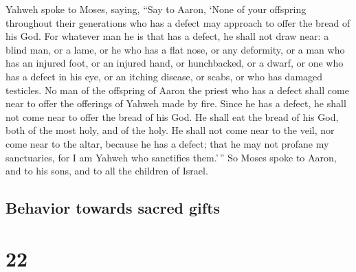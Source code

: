  Yahweh spoke to Moses, saying,  ``Say to
Aaron, `None of your offspring throughout their generations who has a
defect may approach to offer the bread of his God.  For
whatever man he is that has a defect, he shall not draw near: a blind
man, or a lame, or he who has a flat nose, or any deformity,
 or a man who has an injured foot, or an injured hand,
 or hunchbacked, or a dwarf, or one who has a defect in
his eye, or an itching disease, or scabs, or who has damaged testicles.
 No man of the offspring of Aaron the priest who has a
defect shall come near to offer the offerings of Yahweh made by fire.
Since he has a defect, he shall not come near to offer the bread of his
God.  He shall eat the bread of his God, both of the most
holy, and of the holy.  He shall not come near to the
veil, nor come near to the altar, because he has a defect; that he may
not profane my sanctuaries, for I am Yahweh who sanctifies them.'\,''
 So Moses spoke to Aaron, and to his sons, and to all the
children of Israel.

\hypertarget{behavior-towards-sacred-gifts}{%
\subsection{Behavior towards sacred
gifts}\label{behavior-towards-sacred-gifts}}

\hypertarget{section-21}{%
\section{22}\label{section-21}}


